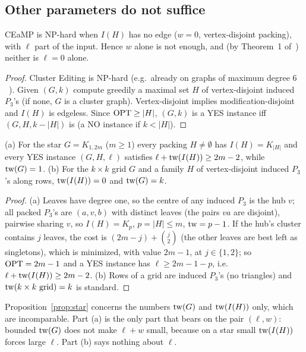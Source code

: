\subsection{Other parameters do not suffice}
\begin{proposition}\label{prop:w0}
CEaMP is NP-hard when $I(H)$ has no edge ($w=0$, vertex-disjoint packing), with $\ell$ part of the input. Hence $w$ alone is not enough, and (by Theorem~1 of~\cite{LPS23}) neither is $\ell=0$ alone.
\end{proposition}
\begin{proof}
Cluster Editing is NP-hard (e.g.\ already on graphs of maximum degree $6$~\cite{KU12}). Given $(G,k)$ compute greedily a maximal set $H$ of vertex-disjoint induced $P_3$'s (if none, $G$ is a cluster graph). Vertex-disjoint implies modification-disjoint and $I(H)$ is edgeless. Since $\mathrm{OPT}\ge|H|$, $(G,k)$ is a YES instance iff $(G,H,k-|H|)$ is (a NO instance if $k<|H|$).
\end{proof}
\begin{proposition}\label{prop:star}
(a) For the star $G=K_{1,2m}$ ($m\ge1$) every packing $H\ne\emptyset$ has $I(H)=K_{|H|}$ and every YES instance $(G,H,\ell)$ satisfies $\ell+\mathrm{tw}(I(H))\ge 2m-2$, while $\mathrm{tw}(G)=1$. (b) For the $k\times k$ grid $G$ and a family $H$ of vertex-disjoint induced $P_3$'s along rows, $\mathrm{tw}(I(H))=0$ and $\mathrm{tw}(G)=k$.
\end{proposition}
\begin{proof}
(a) Leaves have degree one, so the centre of any induced $P_3$ is the hub $v$; all packed $P_3$'s are $(a,v,b)$ with distinct leaves (the pairs $va$ are disjoint), pairwise sharing $v$, so $I(H)=K_p$, $p=|H|\le m$, $\mathrm{tw}=p-1$. If the hub's cluster contains $j$ leaves, the cost is $(2m-j)+\binom j2$ (the other leaves are best left as singletons), which is minimized, with value $2m-1$, at $j\in\{1,2\}$; so $\mathrm{OPT}=2m-1$ and a YES instance has $\ell\ge 2m-1-p$, i.e.\ $\ell+\mathrm{tw}(I(H))\ge 2m-2$. (b) Rows of a grid are induced $P_3$'s (no triangles) and $\mathrm{tw}(k\times k\text{ grid})=k$ is standard.
\end{proof}
Proposition~\ref{prop:star} concerns the numbers $\mathrm{tw}(G)$ and $\mathrm{tw}(I(H))$ only, which are incomparable. Part (a) is the only part that bears on the pair $(\ell,w)$: bounded $\mathrm{tw}(G)$ does not make $\ell+w$ small, because on a star small $\mathrm{tw}(I(H))$ forces large $\ell$. Part (b) says nothing about $\ell$.

